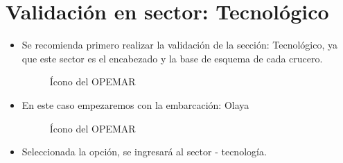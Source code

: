 \documentclass[a4paper,oneside,11pt]{book}
\begin{document}
\section{Validación en sector: Tecnológico}

\begin{itemize}

\item Se recomienda primero realizar la validación de la sección: Tecnológico, ya que este sector es el encabezado y la base de esquema de cada crucero.

\begin{figure}[!h]
 \begin{center} 
 \caption{Ícono del OPEMAR}
\end{center}
 \end{figure}

\item En este caso empezaremos con la embarcación: Olaya 


\begin{figure}[!h]
 \begin{center} 
 \caption{Ícono del OPEMAR}
\end{center}
 \end{figure}


\item Seleccionada la opción, se ingresará al sector - tecnología.




\end{itemize}
\end{document}
